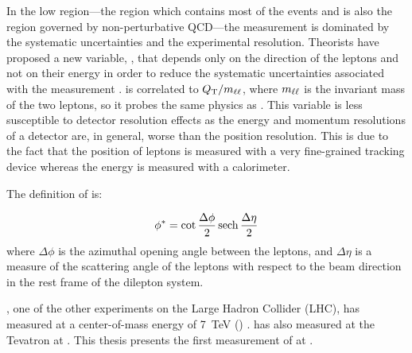 In the low \bosonpt region---the region which contains most of the \Z events
and is also the region governed by non-perturbative QCD---the measurement is
dominated by the systematic uncertainties and the experimental resolution.
Theorists have proposed a new variable, \phistar, that depends only on the
direction of the leptons and not on their energy in order to reduce the
systematic uncertainties associated with the measurement \cite{banfi_2011}.
\phistar is correlated to $Q_{\mathrm{T}} / m_{\ell\ell}$, where $m_{\ell\ell}$ is the invariant mass
of the two leptons, so it probes the same physics as \bosonpt. This variable is
less susceptible to detector resolution effects as the energy and momentum
resolutions of a detector are, in general, worse than the position resolution.
This is due to the fact that the position of leptons is measured with a very
fine-grained tracking device whereas the energy is measured with a calorimeter.

The definition of \phistar is:

\begin{equation}\label{eq:phistar}
    \phi^{*} = \cot \frac{\Delta \phi}{2} \operatorname{sech} \frac{\Delta \eta}{2}
\end{equation}
%
where $\Delta \phi$ is the azimuthal opening angle between the leptons, and
$\Delta \eta$ is a measure of the scattering angle of the leptons with respect
to the beam direction in the rest frame of the dilepton system.

\ATLAS, one of the other experiments on the Large Hadron Collider (LHC), has
measured \phistar at a center-of-mass energy of \SI{7}{\TeV} (\rootsseven)
\cite{atlas_phistar}. \DZERO has also measured \phistar at the Tevatron at
\rootsTevatron \cite{d0_phistar_2011,d0_phistar_2014}. This thesis presents the
first measurement of \phistar at \rootseight.
